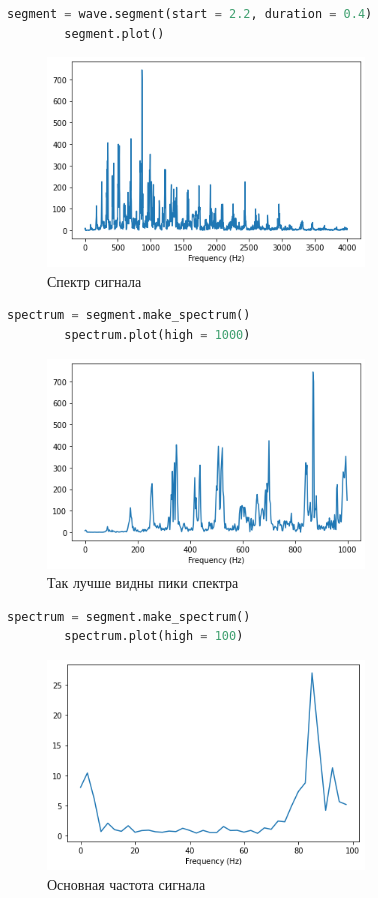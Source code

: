 \documentclass[a4paper, 12pt]{report}
\begin{document}
	\begin{lstlisting}[language=Python,caption=Получение спектра сигнала]
		segment = wave.segment(start = 2.2, duration = 0.4)
		segment.plot()
	\end{lstlisting}
	\begin{figure}[H]
		\centering
		\includegraphics[width=0.75\textwidth]{spectrum4.png}
		\caption{Спектр сигнала}
		\label{fig:spectrum4}
	\end{figure}
	\begin{lstlisting}[language=Python,caption=Улучшаем масштаб спектра]
		spectrum = segment.make_spectrum()
		spectrum.plot(high = 1000)
	\end{lstlisting}
	\begin{figure}[H]
		\centering
		\includegraphics[width=0.75\textwidth]{spectrum5.png}
		\caption{Так лучше видны пики спектра}
		\label{fig:spectrum5}
	\end{figure}
	\begin{lstlisting}[language=Python,caption=Находим основную частоту сигнала (основной пик спектра)]
		spectrum = segment.make_spectrum()
		spectrum.plot(high = 100)
	\end{lstlisting}
	\begin{figure}[H]
		\centering
		\includegraphics[width=0.75\textwidth]{spectrum6.png}
		\caption{Основная частота сигнала}
		\label{fig:spectrum6}
	\end{figure}
\end{document}
